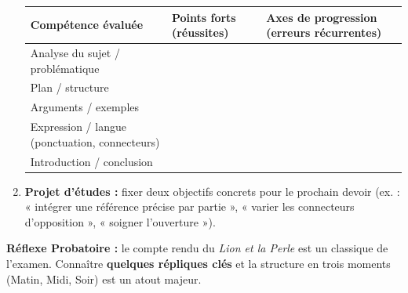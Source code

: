 \documentclass[11pt]{article}
\begin{document}
\begin{methode}
\begin{enumerate}
\begin{center}
\begin{tabularx}{\linewidth}{|l|X|X|}
            \rowcolor{popblueL}\textbf{Compétence évaluée} & \textbf{Points forts (réussites)} & \textbf{Axes de progression (erreurs récurrentes)} \\ \hline
            Analyse du sujet / problématique & & \\ \hline
            Plan / structure & & \\ \hline
            Arguments / exemples & & \\ \hline
            Expression / langue (ponctuation, connecteurs) & & \\ \hline
            Introduction / conclusion & & \\ \hline
            \end{tabularx}
            \end{center}
        \item \textbf{Projet d'études :} fixer deux objectifs concrets pour le prochain devoir (ex. : « intégrer une référence précise par partie », « varier les connecteurs d'opposition », « soigner l'ouverture »).
    \end{enumerate}
    \textbf{Réflexe Probatoire :} le compte rendu du \emph{Lion et la Perle} est un classique de l'examen. Connaître \textbf{quelques répliques clés} et la structure en trois moments (Matin, Midi, Soir) est un atout majeur.
\end{methode}
\end{document}
